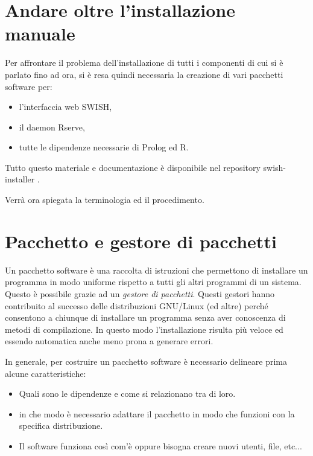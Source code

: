 \documentclass[10pt,titlepage,twoside,a4paper]{report}
\begin{document}

\section{Andare oltre l'installazione manuale}

Per affrontare il problema dell'installazione di tutti i componenti di cui si 
è parlato fino ad ora, si è resa quindi necessaria la creazione di vari 
pacchetti software per:
\begin{itemize}
    \item l'interfaccia web SWISH,
    \item il daemon Rserve,
    \item tutte le dipendenze necessarie di Prolog ed R.
\end{itemize}

Tutto questo materiale e documentazione è disponibile nel repository 
swish-installer \cite{swishInstaller}.
 
Verrà ora spiegata la terminologia ed il procedimento.


\section{Pacchetto e gestore di pacchetti} \label{pacchetto-e-gestore-di-pacchetti}
Un pacchetto software è una raccolta di istruzioni che permettono di 
installare un programma in modo uniforme rispetto a tutti gli altri programmi 
di un sistema. Questo è possibile grazie ad un \emph{gestore di 
pacchetti}. Questi gestori hanno contribuito al successo delle distribuzioni 
GNU/Linux (ed altre) perché consentono a chiunque di installare un 
programma senza aver conoscenza di metodi di compilazione. In questo modo  
l'installazione risulta più veloce ed essendo automatica anche meno prona a 
generare errori.

In generale, per costruire un pacchetto software è necessario delineare prima 
alcune caratteristiche:
\begin{itemize}
    \item Quali sono le dipendenze e come si relazionano tra di loro.
    \item in che modo è necessario adattare il pacchetto in modo che funzioni 
          con la specifica distribuzione.
    \item Il software funziona così com'è oppure bisogna creare nuovi utenti, 
file, etc...
\end{itemize}
\end{document}
